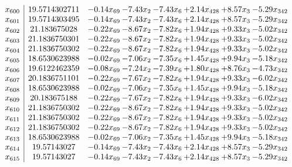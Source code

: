 \documentclass[8pt]{article}
\begin{document}
\[\begin{array}{c| c c@{\hskip 2pt} c@{\hskip 2pt} c@{\hskip 2pt} c@{\hskip 2pt} c@{\hskip 2pt} c@{\hskip 2pt} }
 x_{600}   &  19.5714302711 & -0.14 x_{69} & -7.43 x_{2} & -7.43 x_{6} & +  2.14 x_{428} & +  8.57 x_{3} & -5.29 x_{342}\\
 x_{601}   &  19.5714303495 & -0.14 x_{69} & -7.43 x_{2} & -7.43 x_{6} & +  2.14 x_{428} & +  8.57 x_{3} & -5.29 x_{342}\\
 x_{602}   &  21.183675028 & -0.22 x_{69} & -8.67 x_{2} & -7.82 x_{6} & +  1.94 x_{428} & +  9.33 x_{3} & -5.02 x_{342}\\
 x_{603}   &  21.1836750301 & -0.22 x_{69} & -8.67 x_{2} & -7.82 x_{6} & +  1.94 x_{428} & +  9.33 x_{3} & -5.02 x_{342}\\
 x_{604}   &  21.1836750302 & -0.22 x_{69} & -8.67 x_{2} & -7.82 x_{6} & +  1.94 x_{428} & +  9.33 x_{3} & -5.02 x_{342}\\
 x_{605}   &  18.6530623988 & -0.02 x_{69} & -7.06 x_{2} & -7.35 x_{6} & +  1.45 x_{428} & +  9.94 x_{3} & -5.18 x_{342}\\
 x_{606}   &  19.6122462359 & -0.08 x_{69} & -7.24 x_{2} & -7.39 x_{6} & +  1.80 x_{428} & +  8.76 x_{3} & -4.73 x_{342}\\
 x_{607}   &  20.1836751101 & -0.22 x_{69} & -7.67 x_{2} & -7.82 x_{6} & +  1.94 x_{428} & +  9.33 x_{3} & -6.02 x_{342}\\
 x_{608}   &  18.6530623988 & -0.02 x_{69} & -7.06 x_{2} & -7.35 x_{6} & +  1.45 x_{428} & +  9.94 x_{3} & -5.18 x_{342}\\
 x_{609}   &  20.183675188 & -0.22 x_{69} & -7.67 x_{2} & -7.82 x_{6} & +  1.94 x_{428} & +  9.33 x_{3} & -6.02 x_{342}\\
 x_{610}   &  21.1836750302 & -0.22 x_{69} & -8.67 x_{2} & -7.82 x_{6} & +  1.94 x_{428} & +  9.33 x_{3} & -5.02 x_{342}\\
 x_{611}   &  21.1836750302 & -0.22 x_{69} & -8.67 x_{2} & -7.82 x_{6} & +  1.94 x_{428} & +  9.33 x_{3} & -5.02 x_{342}\\
 x_{612}   &  21.1836750302 & -0.22 x_{69} & -8.67 x_{2} & -7.82 x_{6} & +  1.94 x_{428} & +  9.33 x_{3} & -5.02 x_{342}\\
 x_{613}   &  18.6530623988 & -0.02 x_{69} & -7.06 x_{2} & -7.35 x_{6} & +  1.45 x_{428} & +  9.94 x_{3} & -5.18 x_{342}\\
 x_{614}   &  19.57143027 & -0.14 x_{69} & -7.43 x_{2} & -7.43 x_{6} & +  2.14 x_{428} & +  8.57 x_{3} & -5.29 x_{342}\\
 x_{615}   &  19.57143027 & -0.14 x_{69} & -7.43 x_{2} & -7.43 x_{6} & +  2.14 x_{428} & +  8.57 x_{3} & -5.29 x_{342}\\

\end{array}\]
\end{document}
